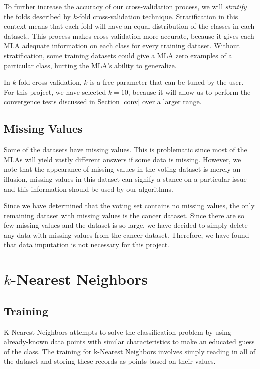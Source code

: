 \documentclass{article}
\begin{document}
		To further increase the accuracy of our cross-validation process, we will \textit{stratify} the folds described by $k$-fold cross-validation technique. 
		Stratification in this context means that each fold will have an equal distribution of the classes in each dataset..
		This process makes cross-validation more accurate, because it gives each MLA adequate information on each class for every training dataset.
		Without stratification, some training datasets could give a MLA zero examples of a particular class, hurting the MLA's ability to generalize.
		
		In $k$-fold cross-validation, $k$ is a free parameter that can be tuned by the user. For this project, we have selected $k = 10$, because it will allow us to perform the convergence tests discussed in Section \ref{conv} over a larger range.
	
	\subsection{Missing Values}
	
		Some of the datasets have missing values. 
		This is problematic since most of the MLAs will yield vastly different answers if some data is missing. 
		However, we note that the appearance of missing values in the voting dataset is merely an illusion, missing values in this dataset can signify a stance on a particular issue and this information should be used by our algorithms. 
		
		Since we have determined that the voting set contains no missing values, the only remaining dataset with missing values is the cancer dataset. Since there are so few missing values and the dataset is so large, we have decided to simply delete any data with missing values from the cancer dataset. Therefore, we have found that data imputation is not necessary for this project. 
	
\section{$k$-Nearest Neighbors}
	\subsection{Training}
		K-Nearest Neighbors attempts to solve the classification problem by using already-known data points with similar characteristics to make an educated guess of the class.  The training for k-Nearest Neighbors involves simply reading in all of the dataset and storing these records as points based on their values.
\end{document}

